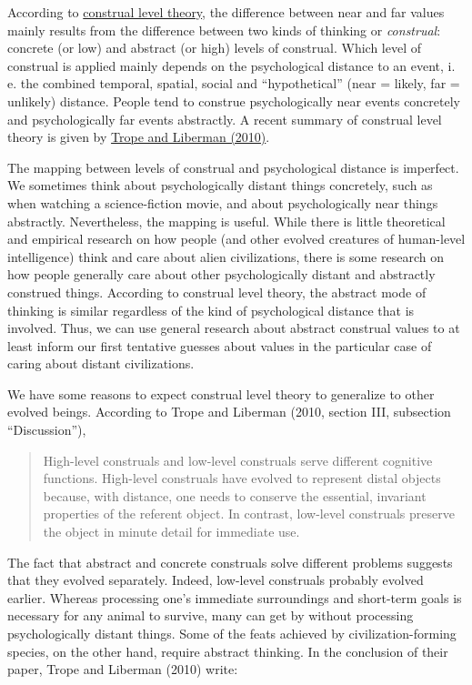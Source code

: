 According to
\href{https://en.wikipedia.org/wiki/Construal_level_theory}{construal
level theory}, the difference between near and far values mainly
results from the difference between two kinds of thinking or
\emph{construal}: concrete (or low) and abstract (or high) levels of
construal. Which level of construal is applied mainly depends on the
psychological distance to an event, i.\,e. the combined temporal, spatial,
social and ``hypothetical'' (near = likely, far = unlikely) distance.
People tend to construe psychologically near events concretely and
psychologically far events abstractly. A recent summary of construal
level theory is given by
\href{http://www.psych.nyu.edu/trope/Trope_Liberman_2010.pdf}{Trope
and Liberman (2010)}.

The mapping between levels of construal and psychological distance is
imperfect. We sometimes think about psychologically distant things
concretely, such as when watching a science-fiction movie, and about
psychologically near things abstractly. Nevertheless, the mapping is
useful. While there is little theoretical and empirical research on how
people (and other evolved creatures of human-level intelligence) think
and care about alien civilizations, there is some research on how people
generally care about other psychologically distant and abstractly
construed things. According to construal level theory, the abstract mode
of thinking is similar regardless of the kind of psychological distance
that is involved. Thus, we can use general research about abstract
construal values to at least inform our first tentative guesses about
values in the particular case of caring about distant civilizations.

We have some reasons to expect construal level theory to generalize to
other evolved beings. According to Trope and Liberman (2010, section
III, subsection ``Discussion''),

\begin{quote}
High-level construals and low-level construals serve different cognitive
functions. High-level construals have evolved to represent distal
objects because, with distance, one needs to conserve the essential,
invariant properties of the referent object. In contrast, low-level
construals preserve the object in minute detail for immediate use.
\end{quote}

The fact that abstract and concrete construals solve different problems
suggests that they evolved separately. Indeed, low-level construals
probably evolved earlier. Whereas processing one's immediate
surroundings and short-term goals is necessary for any animal to
survive, many can get by without processing psychologically distant
things. Some of the feats achieved by civilization-forming species, on
the other hand, require abstract thinking. In the conclusion of their
paper, Trope and Liberman (2010) write:

